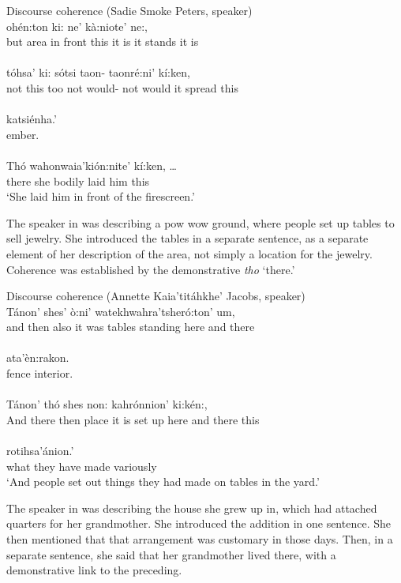 \documentclass[output=paper,colorlinks,citecolor=brown]{langscibook}
\begin{document}
\ea\label{ex:mithun:13}Discourse coherence (Sadie Smoke Peters, speaker)\\
 ohén:ton        ki:   ne'     kà:niote'    ne:,  \\ 
      but       {area in front} this {it is} {it stands}  {it is}\\
\medskip\\
\gll tóhsa' ki:  sótsi taon- taonré:ni' kí:ken,\\
     not  this   too  {not would-}  {not would it spread} this\\
\medskip\\
\gll katsiénha.'\\ 
     ember.\\
\medskip\\
\gll Thó wahonwaia'kión:nite' kí:ken,  \ldots \\
     there  {she bodily laid him} this\\
\glt  `She laid him in front of the firescreen.'
\z

The speaker in  was describing a pow wow ground, where people set up tables to sell jewelry. She introduced the tables in a separate sentence, as a separate element of her description of the area, not simply a location for the jewelry. Coherence was established by the demonstrative \emph{tho} `there.'

\ea\label{ex:mithun:14}Discourse coherence (Annette Kaia'titáhkhe' Jacobs, speaker)\\
\gll Tánon' shes' ò:ni' {watekhwahra'tsheró:ton' um},\\        
     and then  also  {it was tables standing here and there}\\
\medskip\\
\gll ata'èn:rakon.\\           
     {fence interior}.\\
\medskip\\
\gll Tánon' thó shes non: kahrónnion' ki:kén:,\\
     And  there  then  place {it is set up here and there}  this\\
\medskip\\
 rotihsa'ánion.'\\
what {they have made variously}\\
\glt `And people set out things they had made on tables in the yard.'
\z

The speaker in  was describing the house she grew up in, which had attached quarters for her grandmother. She introduced the addition in one sentence. She then mentioned that that arrangement was customary in those days. Then, in a separate sentence, she said that her grandmother lived there, with a demonstrative link to the preceding.
\end{document}
